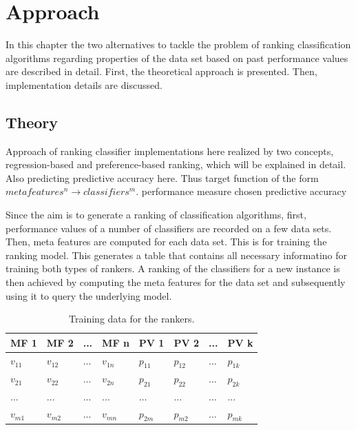 %
\chapter{Approach}
\label{sec:approach}

In this chapter the two alternatives to tackle the problem of ranking classification algorithms regarding properties of the data set based on past performance values are described in detail. First, the theoretical approach is presented. Then, implementation details are discussed.

\section{Theory}

Approach of ranking classifier implementations here realized by two concepts, regression-based and preference-based ranking, which will be explained in detail. Also predicting predictive accuracy here. Thus target function of the form $meta features^n \rightarrow classifiers^m$.
performance measure chosen predictive accuracy

Since the aim is to generate a ranking of classification algorithms, first, performance values of a number of classifiers are recorded on a few data sets. Then, meta features are computed for each data set. This is for training the ranking model. This generates a table that contains all necessary informatino for training both types of rankers. A ranking of the classifiers for a new instance is then achieved by computing the meta features for the data set and subsequently using it to query the underlying model. 

\begin{table}[h]
\centering
	\begin{tabularx}{\textwidth}{X | X | X | X | X | X | X | X}
		MF 1			& MF 2		& ... 	& MF n		& PV 1 		& PV 2 		&	...	&	PV k 		\\ \hline
		$v_{11}$		& $v_{12}$	& ...	& $v_{1n}$	& $p_{11}$	& $p_{12}$	& 	...	&	$p_{1k}$		\\ 
		$v_{21}$		& $v_{22}$	& ...	& $v_{2n}$	& $p_{21}$	& $p_{22}$	& 	...	&	$p_{2k}$		\\ 
		...			& ...		& ...	& ...		& ...		& ...		&	...	&	...			\\ 
		$v_{m1}$		& $v_{m2}$	& ... 	& $v_{mn}$	& $p_{2m}$	& $p_{m2}$	& 	...	&	$p_{mk}$			 
	\end{tabularx}
	\label{tab:performanceValues}
	\caption{Training data for the rankers.}
\end{table}

